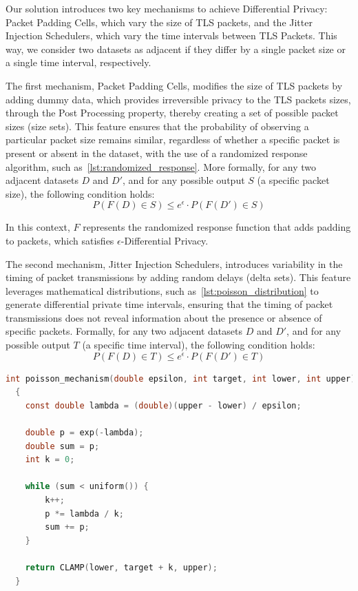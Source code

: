 Our solution introduces two key mechanisms to achieve Differential Privacy: Packet Padding Cells, which vary the size of TLS packets, and the Jitter Injection Schedulers, which vary the time intervals between TLS Packets. This way, we consider two datasets as adjacent if they differ by a single packet size or a single time interval, respectively.

The first mechanism, Packet Padding Cells, modifies the size of TLS packets by adding dummy data, which provides irreversible privacy to the TLS packets sizes, through the Post Processing property, thereby creating a set of possible packet sizes (size sets). This feature ensures that the probability of observing a particular packet size remains similar, regardless of whether a specific packet is present or absent in the dataset, with the use of a randomized response algorithm, such as~\autoref{lst:randomized_response}. 
More formally, for any two adjacent datasets $D$ and $D'$, and for any possible output $S$ (a specific packet size), the following condition holds:
\[P(F(D) \in S) \leq e^{\epsilon} \cdot P(F(D') \in S)\]

In this context, $F$ represents the randomized response function that adds padding to packets, which satisfies $\epsilon$-Differential Privacy. 

The second mechanism, Jitter Injection Schedulers, introduces variability in the timing of packet transmissions by adding random delays (delta sets). This feature leverages mathematical distributions, such as~\autoref{lst:poisson_distribution} to generate differential private time intervals, ensuring that the timing of packet transmissions does not reveal information about the presence or absence of specific packets. Formally, for any two adjacent datasets $D$ and $D'$, and for any possible output $T$ (a specific time interval), the following condition holds:
\[P(F(D) \in T) \leq e^{\epsilon} \cdot P(F(D') \in T)\]

\begin{lstlisting}[language=C, caption={Poisson Distribution Pseudo-Random Number Generator implementation.}, label={lst:poisson_distribution}]
  int poisson_mechanism(double epsilon, int target, int lower, int upper)
  {
    const double lambda = (double)(upper - lower) / epsilon;

    double p = exp(-lambda);
    double sum = p;
    int k = 0;

    while (sum < uniform()) {
        k++;
        p *= lambda / k;
        sum += p;
    }

    return CLAMP(lower, target + k, upper);
  }
\end{lstlisting}

